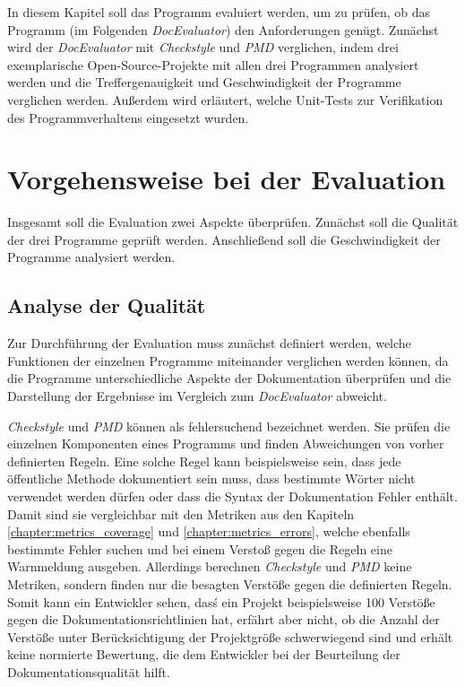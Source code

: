 \newcommand{\checkpmd}{\textit{Checkstyle} und \textit{PMD} }
\newcommand{\doceval}{\textit{DocEvaluator} }
In diesem Kapitel soll das Programm evaluiert werden, um zu prüfen, ob das Programm (im Folgenden \textit{DocEvaluator}) den Anforderungen genügt.  Zunächst wird der \textit{DocEvaluator} mit \checkpmd{} verglichen, indem drei exemplarische Open-Source-Projekte mit allen drei Programmen analysiert werden und die Treffergenauigkeit und Geschwindigkeit der Programme verglichen werden. Außerdem wird  erläutert, welche Unit-Tests zur Verifikation des Programmverhaltens eingesetzt wurden.
\section{Vorgehensweise bei der Evaluation}
Insgesamt soll die Evaluation zwei Aspekte überprüfen. Zunächst soll die Qualität der drei Programme geprüft werden. Anschließend soll die Geschwindigkeit der Programme analysiert werden.

\subsection{Analyse der Qualität}
Zur Durchführung der Evaluation muss zunächst definiert werden, welche Funktionen der einzelnen Programme miteinander verglichen werden können, da die Programme unterschiedliche Aspekte der Dokumentation überprüfen und die Darstellung der Ergebnisse im Vergleich zum \textit{DocEvaluator} abweicht.

\checkpmd können als fehlersuchend bezeichnet werden. Sie prüfen die einzelnen Komponenten eines Programms und finden Abweichungen von vorher definierten Regeln. Eine solche Regel kann beispielsweise sein, dass jede öffentliche Methode dokumentiert sein muss, dass bestimmte Wörter nicht verwendet werden dürfen oder dass die Syntax der Dokumentation Fehler enthält. Damit sind sie vergleichbar mit den Metriken aus den Kapiteln \ref{chapter:metrics_coverage}  und \ref{chapter:metrics_errors}, welche ebenfalls bestimmte Fehler suchen und bei einem Verstoß gegen die Regeln eine Warnmeldung ausgeben. Allerdings berechnen \checkpmd keine Metriken, sondern finden nur die besagten Verstöße gegen die definierten Regeln. Somit kann ein Entwickler sehen, dasś ein Projekt beispielsweise 100 Verstöße gegen die Dokumentationsrichtlinien hat, erfährt aber nicht, ob die Anzahl der Verstöße unter Berücksichtigung der Projektgröße schwerwiegend sind und erhält keine normierte Bewertung, die dem Entwickler bei der Beurteilung der Dokumentationsqualität hilft. 

